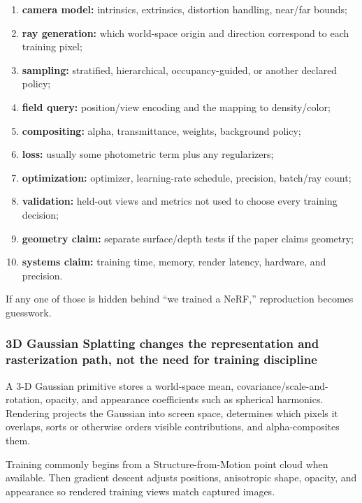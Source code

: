 \begin{enumerate}
\def\labelenumi{\arabic{enumi}.}
\tightlist
\item
  \textbf{camera model:} intrinsics, extrinsics, distortion handling, near/far bounds;
\item
  \textbf{ray generation:} which world-space origin and direction correspond to each training pixel;
\item
  \textbf{sampling:} stratified, hierarchical, occupancy-guided, or another declared policy;
\item
  \textbf{field query:} position/view encoding and the mapping to density/color;
\item
  \textbf{compositing:} alpha, transmittance, weights, background policy;
\item
  \textbf{loss:} usually some photometric term plus any regularizers;
\item
  \textbf{optimization:} optimizer, learning-rate schedule, precision, batch/ray count;
\item
  \textbf{validation:} held-out views and metrics not used to choose every training decision;
\item
  \textbf{geometry claim:} separate surface/depth tests if the paper claims geometry;
\item
  \textbf{systems claim:} training time, memory, render latency, hardware, and precision.
\end{enumerate}

If any one of those is hidden behind ``we trained a NeRF,'' reproduction becomes guesswork.

\subsubsection{3D Gaussian Splatting changes the representation and rasterization path, not the need for training discipline}\label{d-gaussian-splatting-changes-the-representation-and-rasterization-path-not-the-need-for-training-discipline}

A 3-D Gaussian primitive stores a world-space mean, covariance/scale-and-rotation, opacity, and appearance coefficients such as spherical harmonics. Rendering projects the Gaussian into screen space, determines which pixels it overlaps, sorts or otherwise orders visible contributions, and alpha-composites them.

Training commonly begins from a Structure-from-Motion point cloud when available. Then gradient descent adjusts positions, anisotropic shape, opacity, and appearance so rendered training views match captured images.

